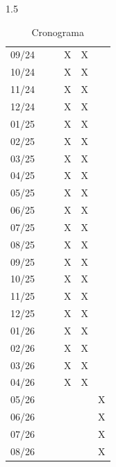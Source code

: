 \documentclass[a4paper,12pt,openright,oneside]{book}
\newenvironment{myenv}[1]
  {\begin{spacing}{#1}}
  {\end{spacing}}
\begin{document}
\begin{myenv}{1.5}
\begin{table}[htbp]
\begin{minipage}{0.45\textwidth}
\begin{tabular}{|c|c|c|c|c|c|}
						\hline
						09/24 & & & X & X & \\
						10/24 & & & X & X & \\
						11/24 & & & X & X & \\
						12/24 & & & X & X & \\
						01/25 & & & X & X & \\
						02/25 & & & X & X & \\
						03/25 & & & X & X & \\
						04/25 & & & X & X & \\
						05/25 & & & X & X & \\
						06/25 & & & X & X & \\
						07/25 & & & X & X & \\
						08/25 & & & X & X & \\
						09/25 & & & X & X & \\
						10/25 & & & X & X & \\
						11/25 & & & X & X & \\
						12/25 & & & X & X & \\
						01/26 & & & X & X & \\
						02/26 & & & X & X & \\
						03/26 & & & X & X & \\
						04/26 & & & X & X & \\
						05/26 & & & & & X \\
						06/26 & & & & & X \\
						07/26 & & & & & X \\
						08/26 & & & & & X \\
						\hline
					\end{tabular}
				\end{minipage}
				\caption{Cronograma}
			\end{table}
	\end{myenv}

	
	
\end{document}
